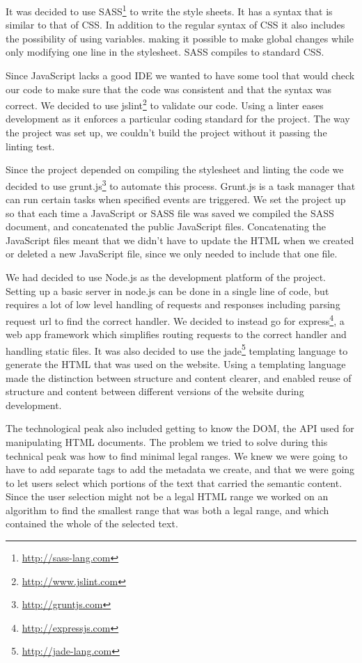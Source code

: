It was decided to use SASS\footnote{\url{http://sass-lang.com}} to write the style sheets.
It has a syntax that is similar to that of CSS.
In addition to the regular syntax of CSS it also includes the possibility of using variables.
making it possible to make global changes while only modifying one line in the stylesheet.
SASS compiles to standard CSS.

Since JavaScript lacks a good IDE we wanted to have some tool that would check our code to make sure that the
code was consistent and that the syntax was correct.
We decided to use jslint\footnote{\url{http://www.jslint.com}} to validate our code.
Using a linter eases development as it enforces a particular coding standard for the project.
The way the project was set up, we couldn't build the project without it passing the linting test.

Since the project depended on compiling the stylesheet and linting the code we decided to use grunt.js\footnote{\url{http://gruntjs.com}}
to automate this process.
Grunt.js is a task manager that can run certain tasks when specified events are triggered.
We set the project up so that each time a JavaScript or SASS file was saved we compiled the SASS document,
and concatenated the public JavaScript files.
Concatenating the JavaScript files meant that we didn't have to update the HTML when we created or deleted a new
JavaScript file, since we only needed to include that one file.

We had decided to use Node.js as the development platform of the project.
Setting up a basic server in node.js can be done in a single line of code,
but requires a lot of low level handling of requests and responses
including parsing request url to find the correct handler.
We decided to instead go for express\footnote{\url{http://expressjs.com}},
a web app framework which simplifies routing requests to the correct handler and handling static files.
It was also decided to use the jade\footnote{\url{http://jade-lang.com}}
templating language to generate the HTML that was used on the website.
Using a templating language made the distinction between structure and content clearer,
and enabled reuse of structure and content between different versions of the website during development.

The technological peak also included getting to know the DOM, the API used for manipulating HTML documents.
The problem we tried to solve during this technical peak was how to find minimal legal ranges.
We knew we were going to have to add separate tags to add the metadata we create,
and that we were going to let users select which portions of the text that carried the semantic content.
Since the user selection might not be a legal HTML range we worked on an algorithm to find the smallest range that
was both a legal range, and which contained the whole of the selected text.


